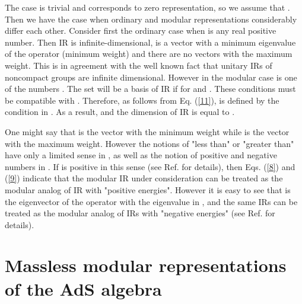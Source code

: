 \documentclass[a4paper,12pt]{article}%
\begin{document}
The case \coordHE{} is trivial and corresponds to zero representation,
so we assume that \coordHE{}. Then we have the case when ordinary 
and modular representations considerably differ each other. 
Consider first the ordinary case when \coordHE{} is any real positive 
number. Then IR is infinite-dimensional, \coordHE{} is a vector
with a minimum eigenvalue of the operator \coordHE{} (minimum weight)
and there are no vectors with the maximum weight. This is in 
agreement with the well known fact that unitary IRs of
noncompact groups are infinite dimensional. However in the
modular case \coordHE{} is one of the numbers \coordHE{}. 
The set \coordHE{} will be a basis
of IR if \coordHE{} for \coordHE{} and \coordHE{}. These conditions
must be compatible with \coordHE{}. Therefore, as follows from
Eq. (\ref{11}), \coordHE{} is defined by the condition \coordHE{} in
\coordHE{}. As a result, \coordHE{} and the dimension of IR is equal
to \coordHE{}.  

One might say that \coordHE{} is the vector with the
minimum weight while \coordHE{} is the vector with the maximum weight.
However the notions of "less than" or "greater than" have only
a limited sense in \coordHE{}, as well as the notion of positive
and negative numbers in \coordHE{}. If \coordHE{} is positive in this sense
(see Ref. \cite{lev2} for details), then Eqs. (\ref{8}) and
(\ref{9}) indicate that the modular IR under consideration can be 
treated as the modular analog of IR with "positive energies".
However it is easy to see that \coordHE{} is the
eigenvector of the operator \coordHE{} with the eigenvalue \coordHE{} in
\coordHE{}, and the same IRs can be treated as the modular analog
of IRs with "negative energies" (see Ref. \cite{lev2} for
details). 

\section{Massless modular representations of the AdS algebra}
\label{S3}
\end{document}

